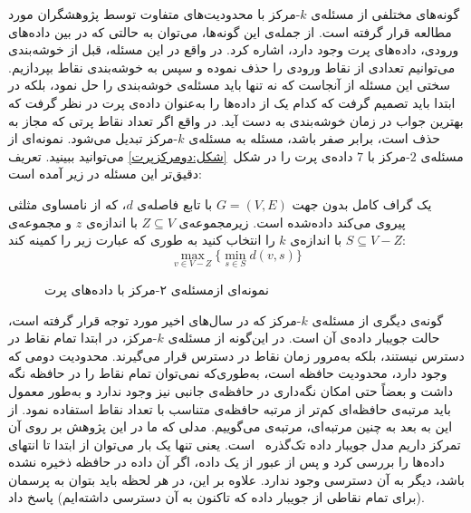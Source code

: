 گونه‌های مختلفی از مسئله‌ی $k$-مرکز با محدودیت‌های متفاوت توسط پژوهشگران مورد مطالعه قرار گرفته است.
از جمله‌ی این گونه‌ها، می‌توان به حالتی که در بین داده‌های ورودی، داده‌های پرت وجود دارد، اشاره کرد.
در واقع در این مسئله، قبل از خوشه‌بندی می‌توانیم تعدادی از نقاط ورودی را حذف نموده و سپس به خوشه‌بندی نقاط بپردازیم.
سختی این مسئله از آنجاست که نه تنها باید مسئله‌ی خوشه‌بندی را حل نمود، بلکه در ابتدا باید تصمیم گرفت که کدام یک از داده‌ها را به‌عنوان داده‌ی پرت در نظر گرفت که بهترین جواب در زمان خوشه‌بندی به دست آید.
در واقع اگر تعداد نقاط پرتی که مجاز به حذف است، برابر صفر باشد، مسئله به مسئله‌ی $k$-مرکز تبدیل می‌شود.
نمونه‌ای از مسئله‌ی $2$-مرکز با $7$ داده‌ی پرت را در شکل~\ref{شکل:دومرکزپرت} می‌توانید ببینید.
تعریف دقیق‌تر این مسئله در زیر آمده است:

\begin{مسئله}
 یک گراف کامل بدون جهت $G = (V, E)$ با تابع فاصله‌ی $d$، که از نامساوی مثلثی پیروی می‌کند داده‌شده است.
زیرمجموعه‌ی $Z \subseteq V$ با اندازه‌ی $z$ و  مجموعه‌ی $S \subseteq V - Z$ با اندازه‌ی $k$ را انتخاب کنید به‌ طوری ‌که عبارت زیر را کمینه کند:
\begin{equation}
\max_{v \in V - Z} \{ \min_{s \in S} d(v, s) \}
\end{equation}
\end{مسئله}

\begin{figure}[t]
\caption{نمونه‌ای از‌مسئله‌ی ۲-مرکز با داده‌های پرت}
\end{figure}

گونه‌ی دیگری از مسئله‌ی $k$-مرکز که در سال‌های اخیر مورد توجه قرار گرفته است، حالت جویبار داده‌ی آن است.
در این‌گونه از مسئله‌ی $k$-مرکز، در ابتدا تمام نقاط در دسترس نیستند، بلکه به‌مرور زمان نقاط در دسترس قرار می‌گیرند.
محدودیت دومی که وجود دارد، محدودیت حافظه است، به‌طوری‌که نمی‌توان تمام نقاط را در حافظه نگه داشت و بعضاً حتی امکان نگه‌داری در حافظه‌ی جانبی نیز وجود ندارد و به‌طور معمول باید مرتبه‌ی حافظه‌ای کم‌تر از مرتبه حافظه‌ی  متناسب با تعداد نقاط استفاده نمود.
از این به بعد به چنین مرتبه‌ای، مرتبه‌ی  می‌گوییم.
مدلی که ما در این پژوهش بر روی آن تمرکز داریم مدل جویبار داده تک‌گذره~\cite{aggarwal2007data} است.
یعنی تنها یک بار می‌توان از ابتدا تا انتهای داده‌ها را بررسی کرد و پس از عبور از یک داده، اگر آن داده در حافظه ذخیره نشده باشد، دیگر به آن دسترسی وجود ندارد. علاوه بر این، در هر لحظه باید بتوان به پرسمان (برای تمام نقاطی از جویبار داده که تاکنون به آن دسترسی داشته‌ایم) پاسخ داد.

